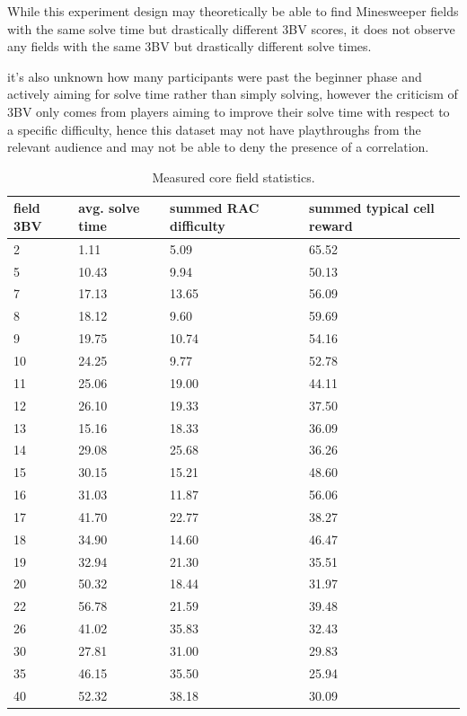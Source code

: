         While this experiment design may theoretically be able to find Minesweeper fields with the same solve time but drastically different 3BV scores, it does not observe any fields with the same 3BV but drastically different solve times.
        
        it's also unknown how many participants were past the beginner phase and actively aiming for solve time rather than simply solving,
        however the criticism of 3BV only comes from players aiming to improve their solve time with respect to a specific difficulty, hence this dataset may not have playthroughs from the relevant audience and may not be able to deny the presence of a correlation.
        
        
        
        \begin{table}
        \footnotesize
        \begin{tabular}{llll}
        \toprule
            field 3BV & avg. solve time & summed RAC difficulty & summed typical cell reward \\
        \midrule
             2 &   1.11 &   5.09 &  65.52 \\
             5 &  10.43 &   9.94 &  50.13 \\
             7 &  17.13 &  13.65 &  56.09 \\
             8 &  18.12 &   9.60 &  59.69 \\
             9 &  19.75 &  10.74 &  54.16 \\
            10 &  24.25 &   9.77 &  52.78 \\
            11 &  25.06 &  19.00 &  44.11 \\
            12 &  26.10 &  19.33 &  37.50 \\
            13 &  15.16 &  18.33 &  36.09 \\
            14 &  29.08 &  25.68 &  36.26 \\
            15 &  30.15 &  15.21 &  48.60 \\
            16 &  31.03 &  11.87 &  56.06 \\
            17 &  41.70 &  22.77 &  38.27 \\
            18 &  34.90 &  14.60 &  46.47 \\
            19 &  32.94 &  21.30 &  35.51 \\
            20 &  50.32 &  18.44 &  31.97 \\
            22 &  56.78 &  21.59 &  39.48 \\
            26 &  41.02 &  35.83 &  32.43 \\
            30 &  27.81 &  31.00 &  29.83 \\
            35 &  46.15 &  35.50 &  25.94 \\
            40 &  52.32 &  38.18 &  30.09 \\
        \bottomrule
        \end{tabular}
        \caption{Measured core field statistics.}
        \label{tab:fieldCoreStatistics}
        \end{table}
        

